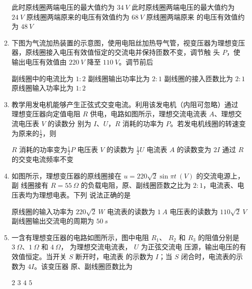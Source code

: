 \begin{enumerate}
\fourchoices
{此时原线圈两端电压的最大值约为 $ 34 \ V $}
{此时原线圈两端电压的最大值约为 $ 24 \ V $}
{原线圈两端原来的电压有效值约为 $ 68 \ V $}
{原线圈两端原来 的电压有效值约为 $ 48 \ V $}


\item 
{}
下图为气流加热装置的示意图，使用电阻丝加热导气管，视变压器为理想变压
器，原线圈接入电压有效值恒定的交流电并保持匝数不变，调节触
头 $ P $，使输出电压有效值由 $ 220 \ V $ 降至 $ 110 \ V $。调节前后  
\begin{figure}[h!]
\centering

\end{figure}

\fourchoices
{副线圈中的电流比为 $ 1:2 $}
{副线圈输出功率比为 $ 2:1 $}
{副线圈的接入匝数比为 $ 2:1 $}
{原线圈输入功率比为 $ 1:2 $}



\item 
{}
教学用发电机能够产生正弦式交变电流。利用该发电机（内阻可忽略）通过
理想变压器向定值电阻 $ R $ 供电，电路如图所示，理想交流电流表 $ A $、理想交流电压表 $ V $ 的读数分
别为 $ I $、$ U $，$ R $ 消耗的功率为 $ P $。若发电机线圈的转速变为原来的$ \frac{ 1 }{ 2 } $，则  
\begin{figure}[h!]
\centering

\end{figure}


\fourchoices
{$ R $ 消耗的功率变为$ \frac{ 1 }{ 2 } P $}
{电压表 $ V $ 的读数为 $ \frac{ 1 }{ 2 } U $}
{电流表 $ A $ 的读数变为 $ 2 I $}
{通过 $ R $ 的交变电流频率不变}



\item 
{}
如图所示，理想变压器的原线圈接在 $ u=220\sqrt{2} \sin \pi t \ (V) $ 的交流电源上，副
线圈接有 $ R=55 \ \Omega $ 的负载电阻，原、副线圈匝数之比为 $ 2:1 $，电流表、电压表均为理想电表。下列
说法正确的是  
\begin{figure}[h!]
\centering

\end{figure}


\fourchoices
{原线圈的输入功率为 $ 220\sqrt{2} \ W $}
{电流表的读数为 $ 1 \ A $}
{电压表的读数为 $ 110\sqrt{2} \ V $}
{副线圈输出交流电的周期为 $ 50 \ s $}

\item 
{}
一含有理想变压器的电路如图所示，图中电阻 $ R_{1} $、 $ R_{2} $ 和 $ R_{3} $ 的阻值分别是
$ 3 \ \Omega $、$ 1 \ \Omega $ 和 $ 4 \ \Omega $， \ammetermytikz 为理想交流电流表， $ U $ 为正弦交流电
压源，输出电压的有效值恒定。当开关 $ S $ 断开时，电流表
的示数为 $ I $；当 $ S $ 闭合时，电流表的示数为 $ 4I $。该变压器
原、副线圈匝数比为  
\begin{figure}[h!]
\centering

\end{figure}

\fourchoices
{$ 2 $}
{$ 3 $}
{$ 4 $}
{$ 5 $}








\end{enumerate}


